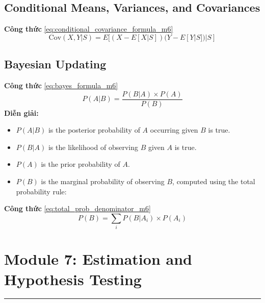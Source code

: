 \subsection*{Conditional Means, Variances, and Covariances}
\begin{tcolorbox}[colback=blue!3!white, colframe=trustvilleblue!80!black, boxrule=0.5pt, arc=3pt, left=6pt, right=6pt, top=4pt, bottom=4pt, breakable]
\noindent\textbf{Công thức} \eqref{eq:conditional_covariance_formula_m6}
\vspace{-0.4em}
\[
\text{Cov}(X, Y | S) = E[(X - E[X|S])(Y - E[Y|S]) | S]
\]
\end{tcolorbox}
\vspace{0.3em}
\subsection*{Bayesian Updating}
\begin{tcolorbox}[colback=blue!3!white, colframe=trustvilleblue!80!black, boxrule=0.5pt, arc=3pt, left=6pt, right=6pt, top=4pt, bottom=4pt, breakable]
\noindent\textbf{Công thức} \eqref{eq:bayes_formula_m6}
\vspace{-0.4em}
\[
P(A|B) = \frac{P(B|A) \times P(A)}{P(B)}
\]
\noindent\textbf{Diễn giải:}
\begin{itemize}[leftmargin=1.5em, noitemsep, topsep=2pt, parsep=0pt]
  \item $P(A|B)$ is the posterior probability of $A$ occurring given $B$ is true.
  \item $P(B|A)$ is the likelihood of observing $B$ given $A$ is true.
  \item $P(A)$ is the prior probability of $A$.
  \item $P(B)$ is the marginal probability of observing $B$, computed using the total probability rule:
\end{itemize}
\end{tcolorbox}
\vspace{0.3em}
\begin{tcolorbox}[colback=blue!3!white, colframe=trustvilleblue!80!black, boxrule=0.5pt, arc=3pt, left=6pt, right=6pt, top=4pt, bottom=4pt, breakable]
\noindent\textbf{Công thức} \eqref{eq:total_prob_denominator_m6}
\vspace{-0.4em}
\[
P(B) = \sum_i P(B|A_i) \times P(A_i)
\]
\end{tcolorbox}
\vspace{0.3em}
\section*{Module 7: Estimation and Hypothesis Testing}
\hrule
\vspace{0.8em}
